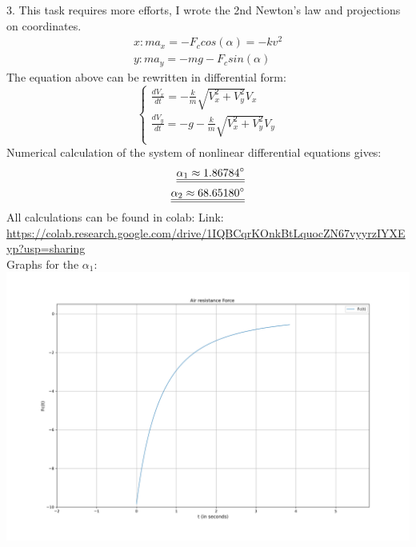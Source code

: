 \documentclass[a4paper,11pt,oneside,article]{memoir}
\def\doubleunderline#1{\underline{\underline{#1}}}
\begin{document}
3. This task requires more efforts, I wrote the 2nd Newton's law and projections on coordinates.
\begin{equation}
    \begin{split}
        x: ma_x = -F_c cos(\alpha) = -k v^2\\
        y: ma_y = -mg-F_c sin(\alpha)
    \end{split}
\end{equation}
The equation above can be rewritten in differential form:\\
\begin{equation}
    \begin{cases}
    \frac{dV_x}{dt} = - \frac{k}{m}\sqrt{V^2_x + V^2_y}V_x\\
    \frac{dV_y}{dt} = - g - \frac{k}{m}\sqrt{V^2_x + V^2_y}V_y\\
\end{cases}
\end{equation}
Numerical calculation of the system of nonlinear differential equations gives:
\begin{equation}
    \begin{split}
        \doubleunderline{\alpha_1 \approx 1.86784\degree}\\
        \doubleunderline{\alpha_2 \approx 68.65180\degree}\\
    \end{split}
\end{equation}
All calculations can be found in colab:
Link: \url{https://colab.research.google.com/drive/1IQBCqrKOnkBtLquocZN67vyyrzIYXEyp?usp=sharing}\\
Graphs for the $\alpha_1$:\\
\includegraphics[width=14cm]{images/fc_first.png}\\
\end{document}
